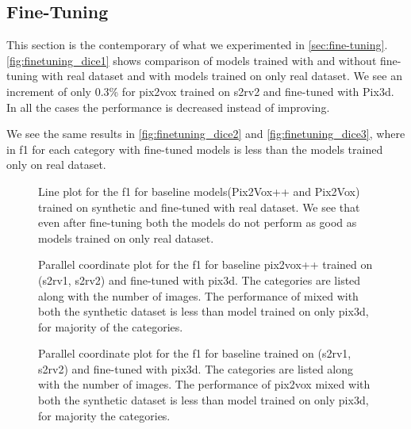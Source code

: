 \subsection{Fine-Tuning}\label{subsec:fine-tuning-dice}

This section is the contemporary of what we experimented in \autoref{sec:fine-tuning}.
\autoref{fig:finetuning_dice1} shows comparison of models trained with and without fine-tuning with real dataset and with models trained on only real dataset.
We see an increment of only 0.3\% for pix2vox trained on \gls{s2rv2} and fine-tuned with Pix3d.
In all the cases the performance is decreased instead of improving.

We see the same results in \autoref{fig:finetuning_dice2} and \autoref{fig:finetuning_dice3}, where in \gls{f1} for each category with fine-tuned models is less than the models trained only on real dataset.

\begin{figure}
    \centering
    \resizebox{0.6\textwidth}{!}{}
    \caption{Line plot for the \gls{f1} for baseline models(Pix2Vox++ and Pix2Vox) trained on synthetic and fine-tuned with real dataset.
    We see that even after fine-tuning both the models do not perform as good as models trained on only real dataset.}
    \label{fig:finetuning_dice1}
\end{figure}

\begin{figure}
    \centering
    \resizebox{0.75\textwidth}{!}{}
    \caption{Parallel coordinate plot for the \gls{f1} for baseline pix2vox++ trained on (\gls{s2rv1}, \gls{s2rv2}) and fine-tuned with pix3d.
    The categories are listed along with the number of images.
    The performance of  mixed with both the synthetic dataset is less than model trained on only pix3d, for majority of the categories.}
    \label{fig:finetuning_dice2}
\end{figure}

\begin{figure}
    \centering
    \resizebox{0.75\textwidth}{!}{}
    \caption{Parallel coordinate plot for the \gls{f1} for baseline  trained on (\gls{s2rv1}, \gls{s2rv2}) and fine-tuned with pix3d.
    The categories are listed along with the number of images.
    The performance of pix2vox mixed with both the synthetic dataset is less than model trained on only pix3d, for majority the categories.}
    \label{fig:finetuning_dice3}
\end{figure}

